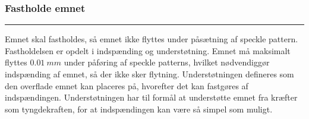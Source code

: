 \subsubsection{Fastholde emnet} \plainbreak{-0.5}
Emnet skal fastholdes, så emnet ikke flyttes under påsætning af speckle pattern. Fastholdelsen er opdelt i indspænding og understøtning. Emnet må maksimalt flyttes \(\SI{0,01}{mm}\) under påføring af speckle patterns, hvilket nødvendiggør indspænding af emnet, så der ikke sker flytning. Understøtningen defineres som den overflade emnet kan placeres på, hvorefter det kan fastgøres af indspændingen. Understøtningen har til formål at understøtte emnet fra kræfter som tyngdekraften, for at indspændingen kan være så simpel som muligt. 



